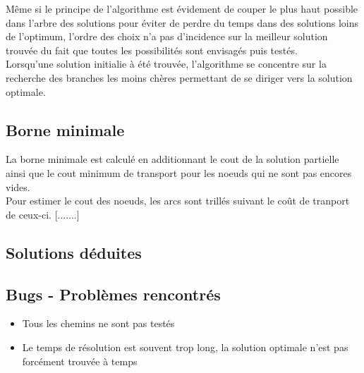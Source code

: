 \documentclass[a4paper, 12pt]{report}
\begin{document}
Même si le principe de l'algorithme est évidement de couper le plus haut possible dans l'arbre des solutions 
pour éviter de perdre du temps dans des solutions loins de l'optimum, 
l'ordre des choix n'a pas d'incidence sur la meilleur solution trouvée 
du fait que toutes les possibilités sont envisagés puis testés.\\

Lorsqu'une solution initialie à été trouvée, l'algorithme se concentre sur la recherche des branches les moins chères
permettant de se diriger vers la solution optimale.

\subsection{Borne minimale}
La borne minimale est calculé en additionnant le cout de la solution partielle ainsi que le cout minimum de transport pour les noeuds qui ne sont pas encores vides. \\
Pour estimer le cout des noeuds, les arcs sont trillés suivant le coût de tranport de ceux-ci. [.......]

\subsection{Solutions déduites}


\subsection{Bugs - Problèmes rencontrés}
\begin{itemize}
 \item Tous les chemins ne sont pas testés
 \item Le temps de résolution est souvent trop long, la solution optimale n'est pas forcément trouvée à temps
\end{itemize}
\end{document}

